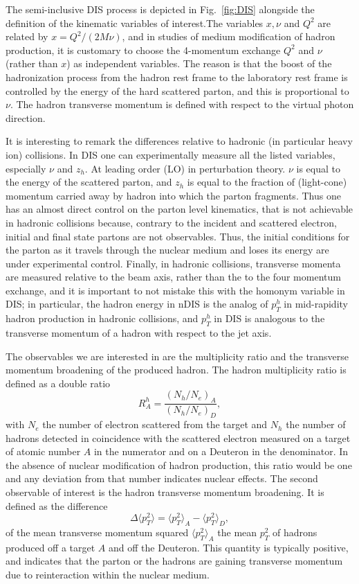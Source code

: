 The semi-inclusive DIS process is depicted in Fig.~\ref{fig:DIS} alongside the definition of the kinematic variables of interest.The variables $x,\nu$ and $Q^2$ are related by  $x = Q^2/(2M\nu)$, and in studies of medium modification of hadron production, it is customary to choose the 4-momentum exchange $Q^2$  and $\nu$ (rather than $x$) as independent variables. The reason is that the boost of the hadronization process from the hadron rest frame to the laboratory rest frame is controlled by the energy of the hard scattered parton, and this is proportional to $\nu$. The hadron transverse momentum is defined with respect to the virtual photon direction.

It is interesting to remark the differences relative to hadronic (in particular heavy ion) collisions. 
In DIS one can experimentally measure all the listed variables, especially $\nu$ and $z_h$. At leading order (LO) in perturbation theory. $\nu$ is equal to the energy of the scattered parton, and $z_h$ is equal to the fraction of (light-cone) momentum carried away by hadron into which the parton fragments. Thus one has an almost direct control on the parton level kinematics, that is not achievable in hadronic collisions because, contrary to the incident and scattered electron, initial and final state partons are not observables.
Thus, the initial conditions for the parton as it travels through the nuclear medium and loses its energy are under experimental control. Finally, in hadronic collisions, transverse momenta are measured relative to the beam axis, rather than the to the four momentum exchange, and it is important to not mistake this with the homonym variable in DIS; in particular, the hadron energy in nDIS is the analog of $p_T^h$ in mid-rapidity hadron production in hadronic collisions, and $p_T^h$ in DIS is analogous to the transverse momentum of a hadron with respect to the jet axis. 

The observables we are interested in are the multiplicity ratio and the 
transverse momentum broadening of the produced hadron. The hadron multiplicity ratio is defined as a double ratio
\begin{equation}
R^h_A = \frac{\left({N_h/N_e}\right)_A }{ \left({N_h/N_{e}}\right)_{D}},
\end{equation}
with $N_e$ the number of electron scattered from the target and $N_h$ the 
number of hadrons detected in coincidence with the scattered electron measured on a target of atomic number $A$ in the numerator and on a Deuteron in the denominator. In the absence of nuclear modification of hadron production, this ratio would be one and any deviation from that number indicates nuclear effects.
%
The second observable of interest is the hadron transverse momentum broadening. It is defined as the difference
\begin{equation}
\Delta \langle p_T^2 \rangle = \langle p_T^2 \rangle_A - \langle p_T^2 \rangle_{D},
\end{equation}
of the mean transverse momentum squared $\langle p_T^2 \rangle_A$ the mean $p_T^2$ of hadrons produced off a target $A$ and off the Deuteron. This quantity is typically positive, and indicates that the parton or the hadrons are gaining transverse momentum due to reinteraction within the nuclear medium.

